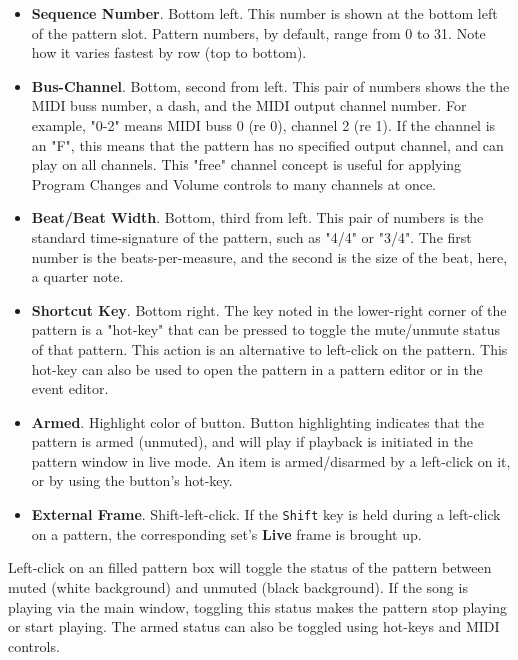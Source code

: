 \begin{itemize}
      \item \textbf{Sequence Number}. Bottom left.
         This number is shown at the bottom left of the pattern slot.
         Pattern numbers, by default, range from 0 to 31.
         Note how it varies fastest by row (top to bottom).
      \item \textbf{Bus-Channel}. Bottom, second from left.
         This pair of numbers shows the the MIDI buss number, a dash, and
         the MIDI output channel number.
         For example, "0-2" means MIDI buss 0 (re 0), channel 2 (re 1).
         If the channel is an "F", this means that the pattern has no specified
         output channel, and can play on all channels.
         This "free" channel concept is useful for applying Program Changes and
         Volume controls to many channels at once.
      \item \textbf{Beat/Beat Width}. Bottom, third from left.
         This pair of numbers is the standard time-signature of the pattern,
         such as "4/4" or "3/4".  The first number is the beats-per-measure,
         and the second is the size of the beat, here, a quarter note.
      \item \textbf{Shortcut Key}.  Bottom right.
         The key noted in the lower-right corner of the pattern is a "hot-key"
         that can be pressed to toggle the mute/unmute status of that pattern.
         This action is an alternative to left-click on the pattern.
         This hot-key can also be used to open the pattern in a pattern editor
         or in the event editor.
      \item \textbf{Armed}. Highlight color of button.
         Button highlighting indicates that the pattern is armed
         (unmuted), and will play if playback is initiated in the pattern
         window in live mode.
         An item is armed/disarmed by a left-click on it, or by using the
         button's hot-key.
      \item \textbf{External Frame}. Shift-left-click.
         If the \texttt{Shift} key is held during a left-click on a pattern,
         the corresponding set's \textbf{Live} frame is brought up.
   \end{itemize}

   Left-click on an filled pattern box will toggle the status of the
   pattern between muted (white background) and unmuted (black background).
   If the song is playing via the main window, toggling this status makes
   the pattern stop playing or start playing.  The armed status
   can also be toggled using hot-keys and MIDI controls.

